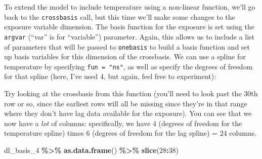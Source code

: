 \documentclass[
]{book}
\newenvironment{Shaded}{\begin{snugshade}}{\end{snugshade}}
\newcommand{\AttributeTok}[1]{\textcolor[rgb]{0.13,0.29,0.53}{#1}}
\newcommand{\DecValTok}[1]{\textcolor[rgb]{0.00,0.00,0.81}{#1}}
\newcommand{\FunctionTok}[1]{\textcolor[rgb]{0.13,0.29,0.53}{\textbf{#1}}}
\newcommand{\NormalTok}[1]{#1}
\newcommand{\OtherTok}[1]{\textcolor[rgb]{0.56,0.35,0.01}{#1}}
\newcommand{\SpecialCharTok}[1]{\textcolor[rgb]{0.81,0.36,0.00}{\textbf{#1}}}
\newcommand{\StringTok}[1]{\textcolor[rgb]{0.31,0.60,0.02}{#1}}
\begin{document}
To extend the model to include temperature using a non-linear function, we'll go back
to the \texttt{crossbasis} call, but this time we'll make some changes to the exposure variable
dimension. The basis function for the exposure is set using the \texttt{argvar} (``var'' is
for ``variable'') parameter. Again, this allows us to include a list of parameters that
will be passed to \texttt{onebasis} to build a basis function and set up basis variables for
this dimension of the crossbasis. We can use a spline for temperature by specifying
\texttt{fun\ =\ "ns"}, as well as specify the degrees of freedom for that spline (here, I've used
4, but again, feel free to experiment):

\begin{Shaded}
\end{Shaded}

Try looking at the crossbasis from this function (you'll need to look past the 30th row
or so, since the earliest rows will all be missing since they're in that range where
they don't have lag data available for the exposure). You can see that we now have a
\emph{lot} of columns: specifically, we have 4 (degrees of freedom for the temperature spline)
times 6 (degrees of freedom for the lag spline) = 24 columns.

\begin{Shaded}
\begin{Highlighting}[]
\NormalTok{dl\_basis\_4 }\SpecialCharTok{\%\textgreater{}\%} 
  \FunctionTok{as.data.frame}\NormalTok{() }\SpecialCharTok{\%\textgreater{}\%} 
  \FunctionTok{slice}\NormalTok{(}\DecValTok{28}\SpecialCharTok{:}\DecValTok{38}\NormalTok{)}
\end{Highlighting}
\end{Shaded}
\end{document}
